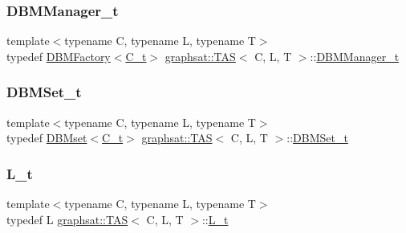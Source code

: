 \mbox{\label{classgraphsat_1_1_t_a_s_a036641a48bebbe8cbf3b1a975dca220a}} 
\subsubsection{\texorpdfstring{DBMManager\_t}{DBMManager\_t}}
{\footnotesize\ttfamily template$<$typename C, typename L, typename T$>$ \\
typedef \mbox{\hyperlink{classgraphsat_1_1_d_b_m_factory}{D\+B\+M\+Factory}}$<$\mbox{\hyperlink{classgraphsat_1_1_t_a_s_a05b063b91c0ab2a4f94380de78344d72}{C\+\_\+t}}$>$ \mbox{\hyperlink{classgraphsat_1_1_t_a_s}{graphsat\+::\+T\+AS}}$<$ C, L, T $>$\+::\mbox{\hyperlink{classgraphsat_1_1_t_a_s_a036641a48bebbe8cbf3b1a975dca220a}{D\+B\+M\+Manager\+\_\+t}}}

\mbox{\label{classgraphsat_1_1_t_a_s_a2844788b40afdf989204ba80ba367750}} 
\subsubsection{\texorpdfstring{DBMSet\_t}{DBMSet\_t}}
{\footnotesize\ttfamily template$<$typename C, typename L, typename T$>$ \\
typedef \mbox{\hyperlink{classgraphsat_1_1_d_b_mset}{D\+B\+Mset}}$<$\mbox{\hyperlink{classgraphsat_1_1_t_a_s_a05b063b91c0ab2a4f94380de78344d72}{C\+\_\+t}}$>$ \mbox{\hyperlink{classgraphsat_1_1_t_a_s}{graphsat\+::\+T\+AS}}$<$ C, L, T $>$\+::\mbox{\hyperlink{classgraphsat_1_1_t_a_s_a2844788b40afdf989204ba80ba367750}{D\+B\+M\+Set\+\_\+t}}}

\mbox{\label{classgraphsat_1_1_t_a_s_a34bf8786372c42fbf45e9d3274a5e325}} 
\subsubsection{\texorpdfstring{L\_t}{L\_t}}
{\footnotesize\ttfamily template$<$typename C, typename L, typename T$>$ \\
typedef L \mbox{\hyperlink{classgraphsat_1_1_t_a_s}{graphsat\+::\+T\+AS}}$<$ C, L, T $>$\+::\mbox{\hyperlink{classgraphsat_1_1_t_a_s_a34bf8786372c42fbf45e9d3274a5e325}{L\+\_\+t}}}

